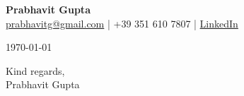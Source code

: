 \documentclass[11pt,a4paper]{article}
\begin{document}
\begin{flushleft}
\textbf{Prabhavit Gupta} \\
\href{mailto:prabhavitg@gmail.com}{prabhavitg@gmail.com} | +39 351 610 7807 | \href{https://www.linkedin.com/in/prabhavit/}{LinkedIn}
\end{flushleft}

\vspace{5mm}
\begin{flushright}
\today
\end{flushright}

\vspace{5mm}

\vspace{5mm}


\vspace{5mm}
\begin{flushright}
Kind regards,\\
\vspace{3mm}
Prabhavit Gupta
\end{flushright}
\end{document}
